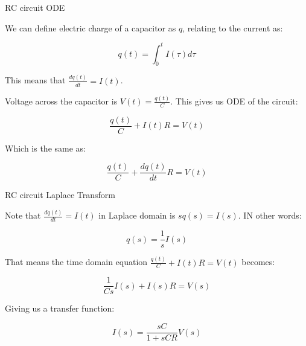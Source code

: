 \documentclass{beamer}
\begin{document}
\begin{frame}{RC circuit ODE}
	\begin{flushleft}
		
		We can define electric charge of a capacitor as $q$, relating to the current as:
		
		\begin{equation}
			q(t) = \int_0^{t} I(\tau) d\tau
		\end{equation}
		
		This means that $\frac{dq(t)}{dt} = I(t)$.
		
		\bigskip
		
		Voltage across the capacitor is $V(t) = \frac{q(t)}{C}$. This gives us ODE of the circuit:
		
		\begin{equation}
			\frac{q(t)}{C} + I(t)R = V(t)
		\end{equation}
		
		Which is the same as:
		
		\begin{equation}
			\frac{q(t)}{C} + \frac{dq(t)}{dt} R = V(t)
		\end{equation}
		
		
	\end{flushleft}
\end{frame}



\begin{frame}{RC circuit Laplace Transform}
	\begin{flushleft}
		
		Note that $\frac{dq(t)}{dt} = I(t)$ in Laplace domain is $s q(s) = I(s)$. IN other words:
		
		\begin{equation}
			q(s) = \frac{1}{s} I(s)
		\end{equation}
		
		That means the time domain equation $\frac{q(t)}{C} + I(t)R = V(t)$ becomes:
		
		\begin{equation}
			\frac{1}{Cs}I(s) + I(s)R = V(s)
		\end{equation}
		
		Giving us a transfer function:
		
		\begin{equation}
			I(s) =  \frac{sC}{1 + sCR}V(s)
		\end{equation}
		
		
	\end{flushleft}
\end{frame}
\end{document}
